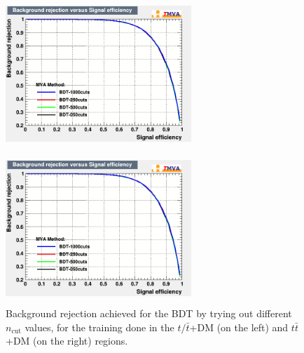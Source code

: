 \documentclass[a4paper, 10pt, openright]{report}
\begin{document}
\begin{appendices}
\begin{figure}[htbp]
\centering
\begin{minipage}[b]{.48\textwidth}
\includegraphics[width=7cm, height=5.7cm]{figs/BDT_cuts_ST.png}
\end{minipage}\hfill
\begin{minipage}[b]{.48\textwidth}
\includegraphics[width=7cm, height=5.7cm]{figs/BDT_cuts_TTbar.png}
\end{minipage} \hfill
\caption{Background rejection achieved for the \ac{BDT} by trying out different $n_{\text{cut}}$ values, for the training done in the $t/ \bar t$+DM (on the left) and $t \bar t$+DM (on the right) regions.}
\label{fig:optCuts}
\end{figure}



\end{appendices}
\end{document}
